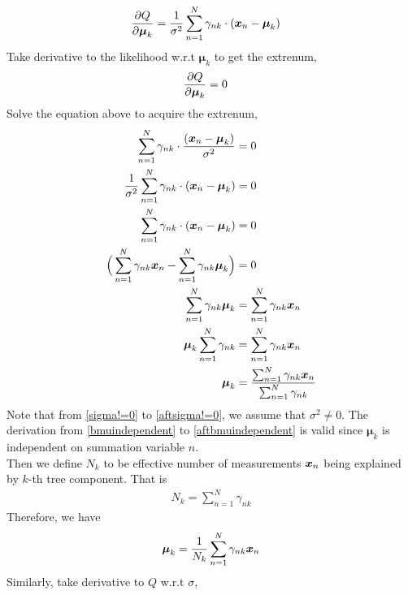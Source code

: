 \documentclass[11pt,a4paper]{article}
\newcommand{\htab}{\hspace*{0.63cm}}
\newcommand{\bmu}{\boldsymbol{\mu}}
\begin{document}
\begin{align}
    \partbmu 
    &= \frac{1}{\sigma^{2}} \sum_{n=1}^{N} \gamma_{nk} \cdot (\difxm)
    \end{align}
\htab Take derivative to the likelihood w.r.t $\bmu_{k}$ to get the extrenum,
    \begin{align}
        \partbmu &= 0 
    \end{align}
\htab Solve the equation above to acquire the extrenum,
\begin{align}
    \sum_{n=1}^{N} \gamma_{nk} \cdot \frac{(\difxm)}{\sigma^{2}} &= 0 \\
    \frac{1}{\sigma^{2}} \sum_{n=1}^{N} \gamma_{nk} \cdot (\difxm) &= 0 \label{sigma!=0} \\
    \sum_{n=1}^{N} \gamma_{nk} \cdot (\difxm) &= 0 \label{aftsigma!=0} \\
    \Big( \sum_{n=1}^{N} \gamma_{nk} \xn - \sum_{n=1}^{N} \gamma_{nk} \bmu_{k}  \Big) &= 0 \\
    \sum_{n=1}^{N} \gamma_{nk} \bmu_{k} &= \sum_{n=1}^{N} \gamma_{nk} \xn \label{bmuindependent}\\
    \bmu_{k} \sum_{n=1}^{N} \gamma_{nk}  &= \sum_{n=1}^{N} \gamma_{nk} \xn \label{aftbmuindependent}\\
    \bmu_{k}   &= \frac{\sum_{n=1}^{N} \gamma_{nk} \xn}{\sum_{n=1}^{N} \gamma_{nk}} 
    \end{align}
    \htab Note that from \eqref{sigma!=0} to \eqref{aftsigma!=0}, we assume that $\sigma^{2} \neq 0$. 
    The derivation from \eqref{bmuindependent} to \eqref{aftbmuindependent} is valid since $\bmu_{k}$
    is independent on summation variable $n$.\\
\htab Then we define $N_{k}$ to be effective number of measurements $\boldsymbol{x}_{n}$ being explained by $k$-th tree component.
That is
\begin{align}
    N_{k} = \sum_{n=1}^{N} \gamma_{nk}
    \end{align}
\htab Therefore, we have 
\begin{align}
    \bmu_{k}   = \frac{1}{N_{k}}\sum_{n=1}^{N} \gamma_{nk} \xn
    \end{align}
\htab Similarly, take derivative to $Q$ w.r.t $\sigma$,
\end{document}

